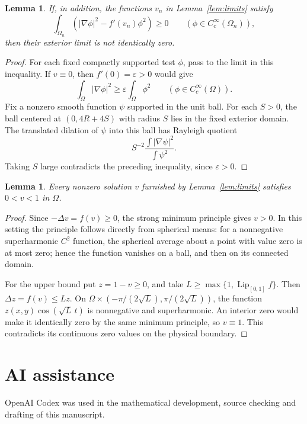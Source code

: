 \documentclass[11pt]{article}
\newtheorem{lemma}[theorem]{Lemma}
\begin{document}
\begin{lemma}\label{lem:nonzero}
If, in addition, the functions \(v_n\) in Lemma~\ref{lem:limits}
satisfy
\[
 \int_{\Omega_n}(|\nabla\phi|^2-f'(v_n)\phi^2)\ge0
 \qquad(\phi\in C_c^\infty(\Omega_n)),
\]
then their exterior limit is not identically zero.
\end{lemma}

\begin{proof}
For each fixed compactly supported test \(\phi\), pass to the limit in
this inequality. If \(v\equiv0\), then \(f'(0)=\varepsilon>0\) would give
\[
 \int_\Omega|\nabla\phi|^2\ge
 \varepsilon\int_\Omega\phi^2
 \qquad(\phi\in C_c^\infty(\Omega)).
\]
Fix a nonzero smooth function \(\psi\) supported in the unit ball.
For each \(S>0\), the ball centered at \((0,4R+4S)\) with radius
\(S\) lies in the fixed exterior domain. The translated dilation of
\(\psi\) into this ball has Rayleigh quotient
\[
 S^{-2}\frac{\int|\nabla\psi|^2}{\int\psi^2}.
\]
Taking \(S\) large contradicts the preceding inequality, since
\(\varepsilon>0\).
\end{proof}

\begin{lemma}\label{lem:strict}
Every nonzero solution \(v\) furnished by Lemma~\ref{lem:limits}
satisfies \(0<v<1\) in \(\Omega\).
\end{lemma}

\begin{proof}
Since \(-\Delta v=f(v)\ge0\), the strong minimum principle gives
\(v>0\). In this setting the principle follows directly from spherical
means: for a nonnegative superharmonic \(C^2\) function, the spherical
average about a point with value zero is at most zero; hence the function
vanishes on a ball, and then on its connected domain.

For the upper bound put \(z=1-v\ge0\), and take
\(L\ge\max\{1,\operatorname{Lip}_{[0,1]}f\}\).
Then \(\Delta z=f(v)\le Lz\).
On
\(\Omega\times(-\pi/(2\sqrt L),\pi/(2\sqrt L))\), the function
\(z(x,y)\cos(\sqrt L\,t)\) is nonnegative and superharmonic.
An interior zero would make it identically zero by the same
minimum principle, so \(v\equiv1\).
This contradicts its continuous zero values on the physical boundary.
\end{proof}

\section*{AI assistance}
OpenAI Codex was used in the mathematical development, source checking
and drafting of this manuscript.
\end{document}
